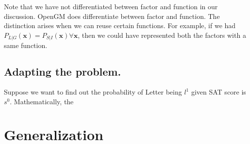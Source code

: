 \documentclass[12pt,oneside,letterpaper]{article}
\begin{document}
Note that we have not differentiated between factor and function in our
discussion. OpenGM does differentiate between factor and function. The distinction arises
when we can reuse certain functions. For example, if we had
$P_{L|G}(\mathbf{x}) = P_{S|I}(\mathbf{x}) \forall \mathbf{x}$, then we could
have represented both the factors with a same function.

\subsection{Adapting the problem.}
Suppose we want to find out the probability of Letter being $l^1$ given SAT score is $s^0$. Mathematically, the 

\section{Generalization}
\end{document}
